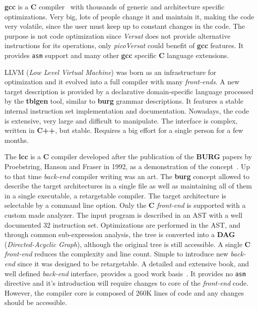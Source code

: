\documentclass[journal]{IEEEtran}
\begin{document}
{\bf gcc} is a {\bf C} compiler~\cite{Stallman:2009} with thousands of
generic and architecture specific optimizations.  Very big, lots of people
change it and maintain it, making the code very volatile, since the user
must keep up to constant changes in the code.  The purpose is not code
optimization since {\it Versat} does not provide alternative instructions
for its operations, only {\it picoVersat} could benefit of {\bf gcc} features.
It provides {\tt asm} support and many other {\bf gcc} specific {\bf C}
language extensions.

{\sc LLVM} ({\em Low Level Virtual Machine}) was born as an infrastructure for
optimization and it evolved into a full compiler with many {\it front-ends}.
A new target description is provided by a declarative domain-specific language
processed by the {\bf tblgen} tool, similar to {\bf burg} grammar descriptions.
It features a stable internal instruction set implementation and documentation.
Nowadays, the code is extensive, very large and difficult to manipulate.
The interface is complex, written in {\bf C++}, but stable.
Requires a big effort for a single person for a few months.

The {\bf lcc} is a {\bf C} compiler developed after the publication of the
{\bf BURG} papers by Proebstring, Hanson and Fraser in 1992, as a
demonstration of the concept~\cite{Fraser:burg,Fraser:gen92,Proebsting:2002}.
Up to that time {\it back-end} compiler writing was an art.
The {\bf burg} concept allowed to describe the
target architectures in a single file as well as maintaining all of them in a
single executable, a retargetable compiler.  The target architecture is
selectable by a command line option.
%
Only the {\bf C} {\it front-end} is supported with a custom made analyzer.
The input program is described in an
{\sc AST} with a well documented 32 instruction set.  Optimizations are
performed in the {\sc AST}, and through common sub-expression analysis, the tree
is converted into a {\bf DAG} ({\em Directed-Acyclic Graph}), although the
original tree is still accessible.
%
A single {\bf C} {\it front-end} reduces the complexity and line count.  Simple to
introduce new {\it back-end} since it was designed to be retargetable.  A detailed and
extensive book, and well defined {\it back-end} interface, provides a good work
basis~\cite{hanson95}.  It provides no {\tt asm} directive and it's introduction
will require changes to core of the {\it front-end} code.  However, the compiler core
is composed of 260K lines of code and any changes should be accessible.
\end{document}

